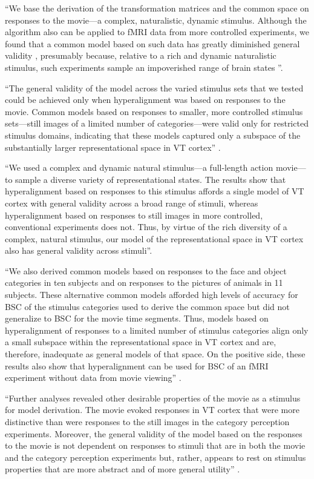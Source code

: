 %
``We base the derivation of the transformation matrices and the common space on
responses to the movie---a complex, naturalistic, dynamic stimulus.
%
Although the algorithm also can be applied to fMRI data from more controlled
experiments, we found that a common model based on such data has greatly
diminished general validity \citep{haxby2011common}, presumably because,
relative to a rich and dynamic naturalistic stimulus, such experiments sample an
impoverished range of brain states \citep{guntupalli2016model}''.

``The general validity of the model across the varied stimulus sets that we
tested could be achieved only when hyperalignment was based on responses to the
movie.
%
Common models based on responses to smaller, more controlled stimulus
sets---still images of a limited number of categories---were valid only for
restricted stimulus domains, indicating that these models captured only a
subspace of the substantially larger representational space in VT cortex''
\citep{haxby2011common}.

``We used a complex and dynamic natural stimulus---a full-length action
movie---to sample a diverse variety of representational states.
%
The results show that hyperalignment based on responses to this stimulus affords
a single model of VT cortex with general validity across a broad range of
stimuli, whereas hyperalignment based on responses to still images in more
controlled, conventional experiments does not.
%
Thus, by virtue of the rich diversity of a complex, natural stimulus, our model
of the representational space in VT cortex also has general validity across
stimuli''\citep{haxby2011common}.

``We also derived common models based on responses to the face and object
categories in ten subjects and on responses to the pictures of animals in 11
subjects.
%
These alternative common models afforded high levels of accuracy for BSC of the
stimulus categories used to derive the common space but did not generalize to
BSC for the movie time segments.
%
Thus, models based on hyperalignment of responses to a limited number of
stimulus categories align only a small subspace within the representational
space in VT cortex and are, therefore, inadequate as general models of that
space.
%
On the positive side, these results also show that hyperalignment can be used
for BSC of an fMRI experiment without data from movie viewing''
\citep{haxby2011common}.

%
``Further analyses revealed other desirable properties of the movie as a
stimulus for model derivation.
%
The movie evoked responses in VT cortex that were more distinctive than were
responses to the still images in the category perception experiments.
%
Moreover, the general validity of the model based on the responses to the movie
is not dependent on responses to stimuli that are in both the movie and the
category perception experiments but, rather, appears to rest on stimulus
properties that are more abstract and of more general utility''
\citep{haxby2011common}.

